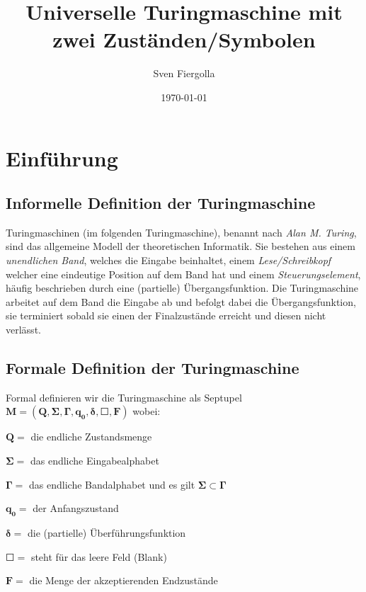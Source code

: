 \documentclass[12pt, a4paper]{article}
\author{Sven Fiergolla}
\title{Universelle Turingmaschine mit zwei Zuständen/Symbolen}
\date{\today}
\begin{document}
 
\maketitle


\section{Einführung}
\subsection{Informelle Definition der Turingmaschine}

Turingmaschinen (im folgenden Turingmaschine), benannt nach \textit{Alan M. Turing}, sind das allgemeine Modell der theoretischen Informatik.
Sie bestehen aus einem \textit{unendlichen Band}, welches die Eingabe beinhaltet, einem \textit{Lese/Schreibkopf} welcher eine eindeutige Position auf dem Band hat und einem \textit{Steuerungselement}, häufig beschrieben durch eine (partielle) Übergangsfunktion.
Die Turingmaschine arbeitet auf dem Band die Eingabe ab und befolgt dabei die Übergangsfunktion, sie terminiert sobald sie einen der Finalzustände erreicht und diesen nicht verlässt.



\subsection{Formale Definition der Turingmaschine}
Formal definieren wir die Turingmaschine als Septupel $\mathbf{ M = (Q,\Sigma,\Gamma,q_0,\delta,\Square,F)}$ wobei:


\begin{description}


 \item{ $\mathbf{ Q = }$ die endliche Zustandsmenge}
 \item{ $\mathbf{ \Sigma = }$ das endliche Eingabealphabet}
 \item $\mathbf{ \Gamma = }$ das endliche Bandalphabet und es gilt $\mathbf{\Sigma\subset\Gamma}$
 \item $\mathbf{ q_0 = }$ der Anfangszustand
 \item $\mathbf{ \delta = }$ die (partielle) Überführungsfunktion
 \item $\mathbf{ \Square = }$ steht für das leere Feld (Blank)
 \item $\mathbf{F = }$ die Menge der akzeptierenden Endzustände

\end{description}
\end{document}
